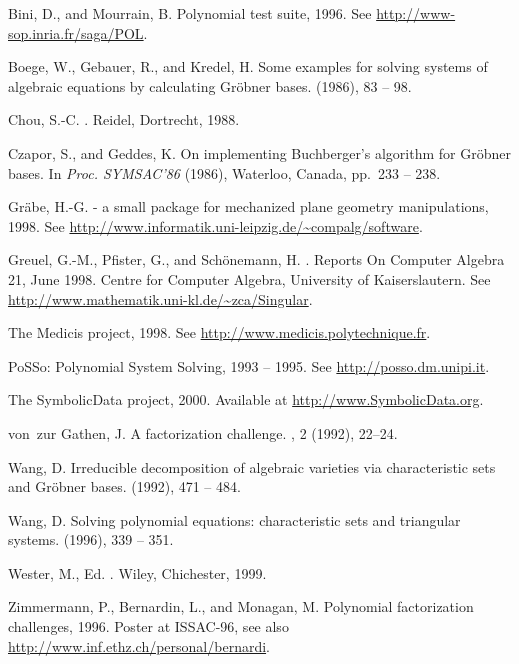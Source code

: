 \documentclass[11pt,a4paper]{article}
\newcommand{\SD}{{\sc Symbolic\-Data}}
\begin{document}

\begin{thebibliography}{10}

{\sc Bini, D., and Mourrain, B.}
\newblock Polynomial test suite, 1996.
\newblock See \url{http://www-sop.inria.fr/saga/POL}.

{\sc Boege, W., Gebauer, R., and Kredel, H.}
\newblock Some examples for solving systems of algebraic equations by
  calculating {Gr\"obner} bases.
 (1986), 83 -- 98.

{\sc Chou, S.-C.}
.
\newblock Reidel, Dortrecht, 1988.

{\sc Czapor, S., and Geddes, K.}
\newblock On implementing {B}uchberger's algorithm for
{G}r\"obner bases. 
\newblock In {\em Proc. SYMSAC'86\/} (1986), Waterloo, Canada,
pp.~233 -- 238. 

{\sc Gr\"abe, H.-G.}
 - a small package for mecha\-nized plane
geometry manipulations, 1998.
\newblock See \url{http://www.informatik.uni-leipzig.de/~compalg/software}.

{\sc Greuel, G.-M., Pfister, G., and Sch{\"o}nemann, H.}
.
\newblock Reports On Computer Algebra 21, June 1998.
\newblock Centre for Computer Algebra, University of Kaiserslautern. See
  \url{http://www.mathematik.uni-kl.de/~zca/Singular}.

The {Medicis} project, 1998.
\newblock See \url{http://www.medicis.polytechnique.fr}.

{PoSSo}: {Polynomial} {System} {Solving}, 1993 -- 1995.
\newblock See \url{http://posso.dm.unipi.it}.

The {\SD} project, 2000.
\newblock Available at \url{http://www.SymbolicData.org}.

{\sc von~zur Gathen, J.}
\newblock A factorization challenge.
, 2 (1992), 22--24.

{\sc Wang, D.}
\newblock Irreducible decomposition of algebraic varieties via
characteristic sets and {G}r\"obner bases.
 (1992), 471 -- 484.

{\sc Wang, D.}
\newblock Solving polynomial equations: characteristic sets and
triangular systems.
 (1996), 339 -- 351.

{\sc Wester, M.}, Ed.
.
\newblock Wiley, Chichester, 1999.

{\sc Zimmermann, P., Bernardin, L., and Monagan, M.}
\newblock Polynomial factorization challenges, 1996.
\newblock Poster at ISSAC-96, see also
  \url{http://www.inf.ethz.ch/personal/bernardi}.

\end{thebibliography}
%
\end{document}
